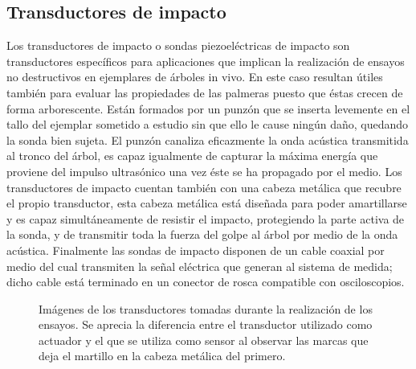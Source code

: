 \subsection{Transductores de impacto}

Los transductores de impacto o sondas piezoeléctricas de impacto son
transductores específicos para aplicaciones que implican la realización de
ensayos no destructivos en ejemplares de árboles in vivo. En este caso
resultan útiles también para evaluar las propiedades de las palmeras puesto
que éstas crecen de forma arborescente. Están formados por un punzón que se
inserta levemente en el tallo del ejemplar sometido a estudio sin que ello
le cause ningún daño, quedando la sonda bien sujeta. El punzón canaliza
eficazmente la onda acústica transmitida al tronco del árbol, es capaz
igualmente de capturar la máxima energía que proviene del impulso
ultrasónico una vez éste se ha propagado por el medio. Los transductores de
impacto cuentan también con una cabeza metálica que recubre el propio
transductor, esta cabeza metálica está diseñada para poder amartillarse y
es capaz simultáneamente de resistir el impacto, protegiendo la parte
activa de la sonda, y de transmitir toda la fuerza del golpe al árbol por
medio de la onda acústica. Finalmente las sondas de impacto disponen de un
cable coaxial por medio del cual transmiten la señal eléctrica que generan
al sistema de medida; dicho cable está terminado en un conector de rosca
compatible con osciloscopios.

\begin{figure}
    \begin{center}
	\qquad
    \end{center}
    \caption[Transductores de impacto utilizados durante los
    ensayos]{Imágenes de los transductores tomadas durante la realización
    de los ensayos. Se aprecia la diferencia entre el transductor utilizado
    como actuador y el que se utiliza como sensor al observar las marcas
    que deja el martillo en la cabeza metálica del primero.}
    \label{fig:impacttransducers}
\end{figure}

